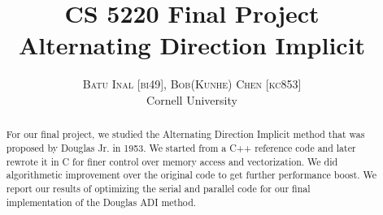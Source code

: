 \documentclass[a4paper,11pt]{article}
\title{\vspace{-15mm}\fontsize{24pt}{10pt}\selectfont\textbf{CS 5220 Final Project \\ \Large Alternating Direction Implicit}} %
\author{
\large
\textsc{Batu Inal [bi49], Bob(Kunhe) Chen [kc853]}\\
\normalsize Cornell University \\ %
[2mm] 
\vspace{-20mm}
}
\date{}
\begin{document}
\setlength{\textwidth}{500pt}
\maketitle %
\thispagestyle{fancy} %
\begin{abstract}
\noindent %
For our final project, we studied the Alternating Direction Implicit method that was proposed by Douglas Jr. in 1953. We started from a C++ reference code and later rewrote it in C for finer control over memory access and vectorization. We did algorithmetic improvement over the original code to get further performance boost. We report our results of optimizing the serial and parallel code for our final implementation of the Douglas ADI method.
\end{abstract}
\end{document}
